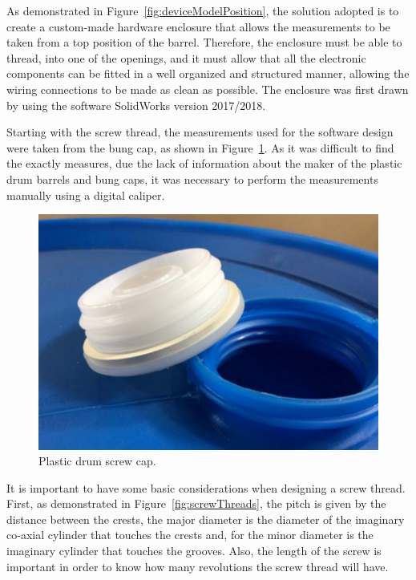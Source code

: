 As demonstrated in Figure~\ref{fig:deviceModelPosition}, the solution adopted is to create a custom-made hardware enclosure
that allows the measurements to be taken from a top position of the barrel. Therefore, the enclosure must be able to thread, into one of the openings, and it must allow that all the electronic components can be fitted in a well organized and structured manner, allowing the wiring connections to be made as clean as possible. The enclosure was first drawn by using the software SolidWorks version 2017/2018. 

Starting with the screw thread, the measurements used for the software design were taken from the bung cap, as shown in Figure~\ref{fig:plasticDrumCaps}. As it was difficult to find the exactly measures, due the lack of information about the maker of the plastic drum barrels and bung caps, it was necessary to perform the measurements manually using a digital caliper.

\begin{figure}[h!]
    \centering
    \includegraphics[scale=0.8]{images/Development/3D_device_development/plasticDrumCaps.pdf}
    \caption{Plastic drum screw cap.}
    \label{fig:plasticDrumCaps}
\end{figure}

It is important to have some basic considerations when designing a screw thread. First, as demonstrated in Figure~\ref{fig:screwThreads}, the pitch is given by the distance between the crests, the major diameter is the diameter of the imaginary co-axial cylinder that touches the crests and, for the minor diameter is the imaginary cylinder that touches the grooves. Also, the length of the screw is important in order to know how many revolutions the screw thread will have.

